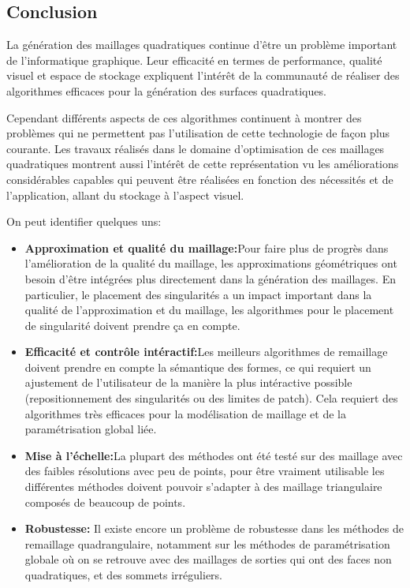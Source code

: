 \documentclass[runningheads]{llncs}
\begin{document}
\subsection{Conclusion}
La génération des maillages quadratiques continue d’être un problème important de l’informatique graphique. Leur efficacité en termes de performance, qualité visuel et espace de stockage expliquent l'intérêt de la communauté de réaliser des algorithmes efficaces pour la génération des surfaces quadratiques. 

Cependant différents aspects de ces algorithmes continuent à montrer des problèmes qui ne permettent pas l’utilisation de cette technologie de façon plus courante.  Les travaux réalisés dans le domaine d’optimisation de ces maillages quadratiques montrent aussi l'intérêt de cette représentation vu les améliorations considérables capables qui peuvent être réalisées en fonction des nécessités et de l’application, allant du stockage à l'aspect visuel.

On peut identifier quelques uns:

\begin{itemize}
  \item \textbf{Approximation et qualité du maillage:}Pour faire plus de progrès dans l’amélioration de la qualité du maillage, les approximations géométriques ont besoin d’être intégrées plus directement dans la génération des maillages. En particulier, le placement des singularités a un impact important dans la qualité de l’approximation et du maillage, les algorithmes pour le placement de singularité doivent prendre ça en compte.
  
  \item  \textbf{Efficacité et contrôle intéractif:}Les meilleurs algorithmes de remaillage doivent prendre en compte la sémantique des formes, ce qui requiert un ajustement de l’utilisateur de la manière la plus intéractive possible (repositionnement des singularités ou des limites de patch). Cela requiert des algorithmes très efficaces pour la modélisation de maillage et de la paramétrisation global liée.
  
  \item  \textbf{Mise à l'échelle:}La plupart des méthodes ont été testé sur des maillage avec des faibles résolutions avec peu de points, pour être vraiment utilisable les différentes méthodes doivent pouvoir s’adapter à des maillage triangulaire composés de beaucoup de points.
  
    \item \textbf{Robustesse:} Il existe encore un problème de robustesse dans les méthodes de remaillage quadrangulaire, notamment sur les méthodes de paramétrisation globale où on se retrouve avec des maillages de sorties qui ont des faces non quadratiques, et des sommets irréguliers.
    
\end{itemize}

\newpage
\printbibliography
\end{document}
